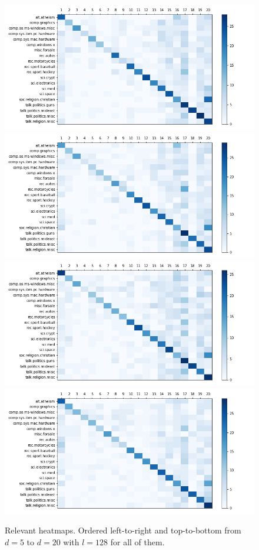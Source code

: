 \documentclass[12pt]{article}
\begin{document}
\begin{enumerate}[label=(\alph*)]
\begin{figure}[!ht]
      \includegraphics[scale=0.2]{figures/local_sensitivity_hashing_l=128_d=17.png}
      \includegraphics[scale=0.2]{figures/local_sensitivity_hashing_l=128_d=18.png}
      \includegraphics[scale=0.2]{figures/local_sensitivity_hashing_l=128_d=19.png}
      \includegraphics[scale=0.2]{figures/local_sensitivity_hashing_l=128_d=20.png}
      \caption{Relevant heatmaps. Ordered left-to-right and top-to-bottom from $d=5$ to $d=20$ with $l=128$ for all of them.}
    \end{figure}


\end{enumerate}
\end{document}
